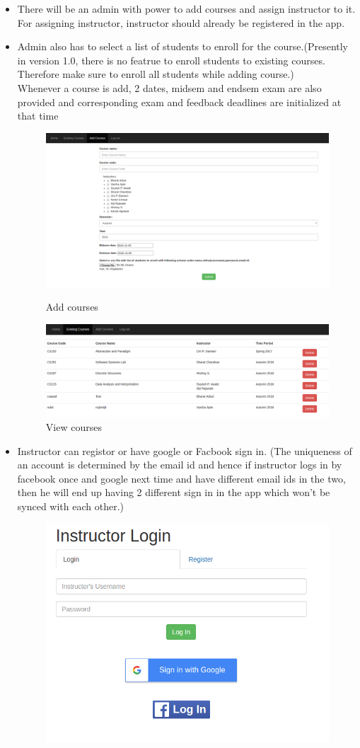 \documentclass[12pt]{extreport}
\begin{document}
  \begin{itemize}
  \item There will be an admin with power to add courses and assign instructor to it. For assigning instructor, instructor should already be registered in the app.
  \item Admin also has to select a list of students to enroll for the course.(Presently in version 1.0, there is no featrue to enroll students to existing courses. Therefore make sure to enroll all students while adding course.)\\
  Whenever a course is add, 2 dates, midsem and endsem exam are also provided and corresponding exam and feedback deadlines are initialized at that time
  \begin{figure}[ht!]
    \centering
    \begin{minipage}{.5\textwidth}
      \centering
      \includegraphics[width=.4\linewidth]{images/admin_addcourses.png}
      \caption{Add courses \label{overflow}}
      \label{fig:sub1}
    \end{minipage}%
    \begin{minipage}{.5\textwidth}
      \centering
      \includegraphics[width=.4\linewidth]{images/admin_courses.png}
      \caption{View courses \label{overflow}}
      \label{fig:sub1}
    \end{minipage}%
  \end{figure}
  \item Instructor can registor or have google or Facbook sign in. (The uniqueness of an account is determined by the email id and hence if instructor logs in by facebook once and google next time and have different email ids in the two, then he will end up having 2 different sign in in the app which won't be synced with each other.)
  \begin{figure}[ht!]
    \centering
    \begin{minipage}{.5\textwidth}
      \centering
      \includegraphics[width=.4\linewidth]{images/instructor_login.png}

\end{minipage}
\end{figure}
\end{itemize}
\end{document}
